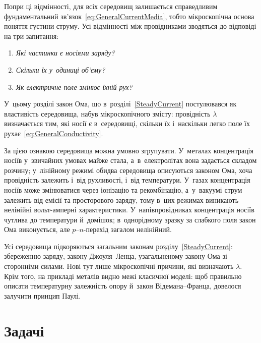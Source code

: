 Попри ці відмінності, для всіх середовищ залишається справедливим фундаментальний
зв'язок~\eqref{eq:GeneralCurrentMedia}, тобто мікроскопічна основа поняття густини струму.
Усі відмінності між провідниками зводяться до відповіді на три запитання:

\begin{enumerate}
	\item \emph{Які частинки є носіями заряду?}
	\item \emph{Скільки їх у~одиниці об'єму?}
	\item \emph{Як електричне поле змінює їхній рух?}
\end{enumerate}

У~цьому розділі закон Ома, що в~розділі~\ref{SteadyCurrent} постулювався як властивість
середовища, набув мікроскопічного змісту: провідність $\lambda$ визначається тим, які
носії є в~середовищі, скільки їх і~наскільки легко поле їх
рухає~\eqref{eq:GeneralConductivity}.

За цією ознакою середовища можна умовно згрупувати. У~металах концентрація носіїв у~звичайних
умовах майже стала, а~в~електролітах вона задається складом розчину; у~лінійному режимі
обидва середовища описуються законом Ома, хоча провідність залежить і~від рухливості, і~від
температури. У~газах концентрація носіїв може змінюватися через іонізацію та рекомбінацію,
а~у~вакуумі струм залежить від емісії та просторового заряду, тому в~цих режимах виникають
нелінійні вольт-амперні характеристики. У~напівпровідниках концентрація носіїв чутлива до
температури й~домішок; в~однорідному зразку за слабкого поля закон Ома виконується, але
$p$--$n$-перехід загалом нелінійний.



Усі середовища підкоряються загальним законам розділу~\ref{SteadyCurrent}: збереженню
заряду, закону Джоуля--Ленца, узагальненому закону Ома зі сторонніми силами. Нові тут лише
мікроскопічні причини, які визначають $\lambda$. Крім того, на прикладі металів видно межі
класичної моделі: щоб правильно описати температурну залежність опору й~закон
Відемана--Франца, довелося залучити принцип Паулі.


\section*{Задачі}


 {}

